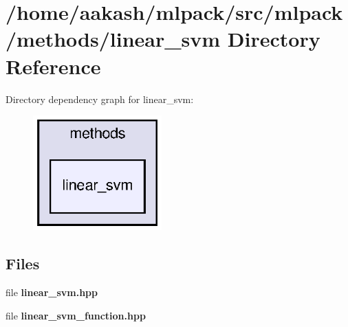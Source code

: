 \section{/home/aakash/mlpack/src/mlpack/methods/linear\+\_\+svm Directory Reference}
\label{dir_b3a7f93975f79d9d4061ae46aea4ffb8}
Directory dependency graph for linear\+\_\+svm\+:
\nopagebreak
\begin{figure}[H]
\begin{center}
\leavevmode
\includegraphics[width=140pt]{dir_b3a7f93975f79d9d4061ae46aea4ffb8_dep}
\end{center}
\end{figure}
\subsection*{Files}
\begin{DoxyCompactItemize}
\item 
file \textbf{ linear\+\_\+svm.\+hpp}
\item 
file \textbf{ linear\+\_\+svm\+\_\+function.\+hpp}
\end{DoxyCompactItemize}

